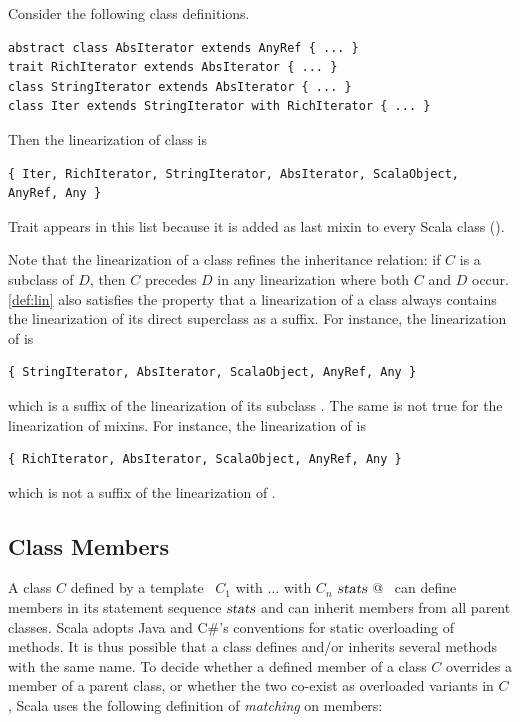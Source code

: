 \example Consider the following class definitions.
\begin{lstlisting}
abstract class AbsIterator extends AnyRef { ... }
trait RichIterator extends AbsIterator { ... }
class StringIterator extends AbsIterator { ... }
class Iter extends StringIterator with RichIterator { ... }
\end{lstlisting}
Then the linearization of class \lstinline@Iter@ is
\begin{lstlisting}
{ Iter, RichIterator, StringIterator, AbsIterator, ScalaObject, AnyRef, Any }
\end{lstlisting}
Trait \lstinline@ScalaObject@ appears in this list because it 
is added as last mixin to every Scala class ().

Note that the linearization of a class refines the inheritance
relation: if $C$ is a subclass of $D$, then $C$ precedes $D$ in any
linearization where both $C$ and $D$ occur.
\ref{def:lin} also satisfies the property that a linearization
of a class always contains the linearization of its direct superclass
as a suffix.  For instance, the linearization of
\lstinline@StringIterator@ is
\begin{lstlisting}
{ StringIterator, AbsIterator, ScalaObject, AnyRef, Any }
\end{lstlisting}
which is a suffix of the linearization of its subclass \lstinline@Iter@.
The same is not true for the linearization of mixins.
For instance, the linearization of \lstinline@RichIterator@ is
\begin{lstlisting}
{ RichIterator, AbsIterator, ScalaObject, AnyRef, Any }
\end{lstlisting}
which is not a suffix of the linearization of \lstinline@Iter@.


\subsection{Class Members}
\label{sec:members}

A class $C$ defined by a template 
~\lstinline@$C_1$ with $\ldots$ with $C_n$ { $\mbox{\sl stats}$ }@~ 
can define members in its statement sequence
$\mbox{\sl stats}$ and can inherit members from all parent classes.  Scala
adopts Java and C\#'s conventions for static overloading of
methods. It is thus possible that a class defines and/or inherits
several methods with the same name.  To decide whether a defined
member of a class $C$ overrides a member of a parent class, or whether
the two co-exist as overloaded variants in $C$, Scala uses the
following definition of {\em matching} on members:

